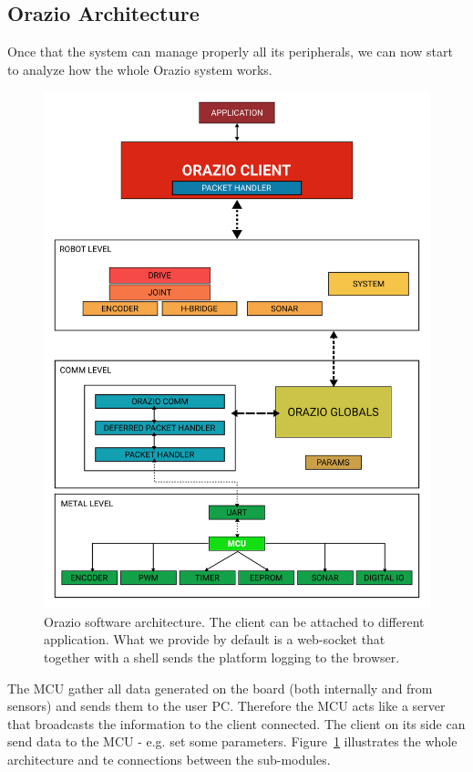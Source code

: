 \documentclass[10pt,a4paper, notitlepage]{report}
\begin{document}
\subsection*{Orazio Architecture}
Once that the system can manage properly all its peripherals, we can now start to analyze how the whole Orazio system works.

\begin{figure}[!h]
  \centering
  \includegraphics[width=0.8\linewidth]{pics/orazio_arch}
  \caption{Orazio software architecture. The client can be attached to different application. What we provide by default is a web-socket that together with a shell sends the platform logging to the browser.}
  \label{fig:orazio_arch}
\end{figure}

The MCU gather all data generated on the board (both internally and from sensors) and sends them to the user PC. Therefore the MCU acts like a server that broadcasts the information to the client connected. The client on its side can send data to the MCU - e.g. set some parameters. Figure~\ref{fig:orazio_arch} illustrates the whole architecture and te connections between the sub-modules.
\end{document}

